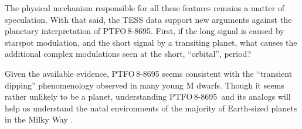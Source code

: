 \documentclass[12pt,twocolumn,tighten]{aastex62}
\newcommand{\ptfo}{PTFO$\,$8-8695}
\begin{document}
The physical mechanism responsible for all these features remains a
matter of speculation.
With that said, the TESS data support new arguments against the planetary
interpretation of \ptfo.
First, if the long signal is caused by starspot modulation, and the
short signal by a transiting planet, what causes the additional
complex modulations seen at the short, ``orbital'', period?

Given the available evidence,
PTFO$\,$8-8695 seems consistent with the
``transient dipping'' phenomenology observed in many young M dwarfs.
Though it seems rather unlikely to be a planet, understanding \ptfo\
and its analogs will help us understand the natal environments 
of the majority of Earth-sized planets in the Milky Way
\citep{dressing_occurrence_2013}.



\end{document}
